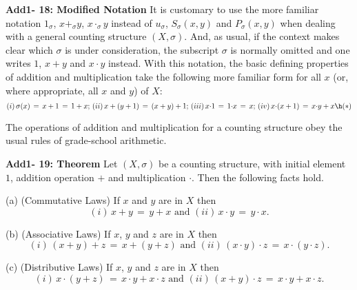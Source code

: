 {\V
\V

        {\bf Add1- 18: Modified Notation} It is customary to use the more familiar notation $1_{{\sigma}}$, $x+_{{\sigma}}y$, $x{\cdot}_{{\sigma}}y$
    instead of $u_{{\sigma}}$, $S_{{\sigma}}(x,y)$ and $P_{{\sigma}}(x,y)$ when dealing with a general counting structure $(X,{\sigma})$.
    And, as usual, if the context makes clear which ${\sigma}$ is under consideration, the subscript ${\sigma}$ is normally omitted and one writes $1$, $x+y$ and $x{\cdot}y$ instead.
    With this notation, the basic defining properties of addition and multiplication take the following more familiar form for all $x$ (or, where appropriate, all $x$ and $y$) of $X$:
        \begin{displaymath}
        (i)\, {\sigma}(x) \,=\, x+1 \,=\, 1+x;\, (ii)\, x+(y+1) \,=\, (x+y)+1; \, (iii)\, x{\cdot}1 \,=\, 1{\cdot}x \,=\, x; \, (iv)\, x{\cdot}(x+1) \,=\, x{\cdot}y+x \h ({\ast})
        \end{displaymath}

\V
\V

        The operations of addition and multiplication for a counting structure obey the usual rules of grade-school arithmetic.

\V

        {\bf Add1- 19: Theorem} Let $(X,{\sigma})$ be a counting structure, with initial element $1$, addition operation $+$ and multiplication ${\cdot}$.
    Then the following facts hold.

\V

        (a) (Commutative Laws) If $x$ and $y$  are in $X$  then
        \begin{displaymath}
        (i)\, x+y \,=\, y+x \mbox{ and } (ii)\, x{\cdot}y \,=\, y{\cdot}x.
        \end{displaymath}


\V

        (b) (Associative Laws) If $x$, $y$ and $z$ are in $X$  then
        \begin{displaymath}
        (i)\, (x+y)+z \,=\, x+(y+z) \mbox{ and } (ii)\, (x{\cdot}y){\cdot}z \,=\, x{\cdot}(y{\cdot}z).
        \end{displaymath}


\V

        (c) (Distributive Laws) If $x$, $y$ and $z$ are in $X$ then
        \begin{displaymath}
        (i)\, x{\cdot}(y+z) \,=\, x{\cdot}y + x{\cdot}z \mbox{ and } (ii)\, (x+y){\cdot}z \,=\, x{\cdot}y + x{\cdot}z.
        \end{displaymath}



}

